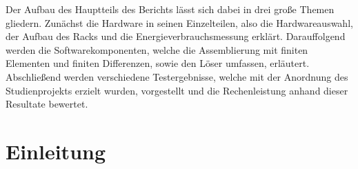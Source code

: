 Der Aufbau des Hauptteils des Berichts lässt sich dabei in drei große Themen gliedern.
 Zunächst die Hardware in seinen Einzelteilen, also die Hardwareauswahl,
 der Aufbau des Racks und die Energieverbrauchsmessung erklärt.
 Darauffolgend werden die Softwarekomponenten, welche die Assemblierung mit finiten Elementen und finiten Differenzen,
 sowie den Löser umfassen, erläutert. Abschließend werden verschiedene Testergebnisse,
 welche mit der Anordnung des Studienprojekts erzielt wurden, vorgestellt und die Rechenleistung anhand dieser Resultate bewertet. 



\section{Einleitung}


